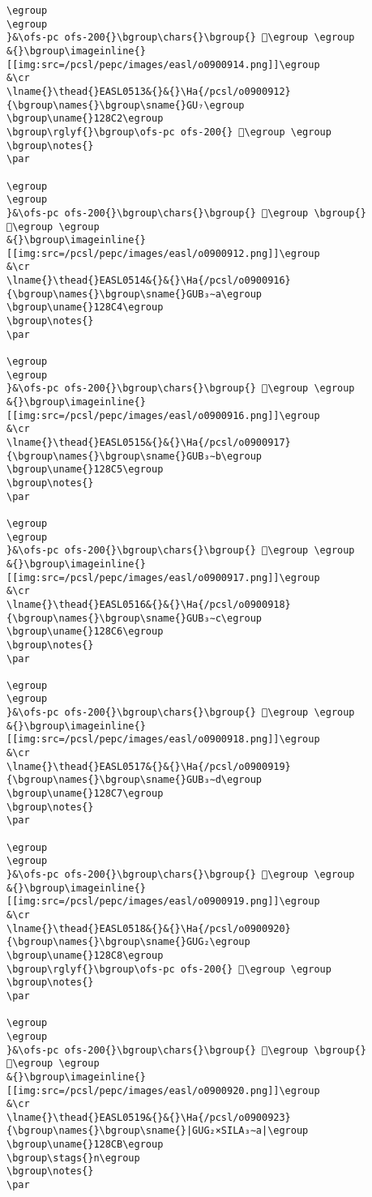 \begin{verbatim}
\egroup
\egroup
}&\ofs-pc ofs-200{}\bgroup\chars{}\bgroup{} 𒣀\egroup \egroup
&{}\bgroup\imageinline{}[[img:src=/pcsl/pepc/images/easl/o0900914.png]]\egroup
&\cr
\lname{}\thead{}EASL0513&{}&{}\Ha{/pcsl/o0900912}{\bgroup\names{}\bgroup\sname{}GU₇\egroup
\bgroup\uname{}128C2\egroup
\bgroup\rglyf{}\bgroup\ofs-pc ofs-200{} 𒣂\egroup \egroup
\bgroup\notes{}
\par 

\egroup
\egroup
}&\ofs-pc ofs-200{}\bgroup\chars{}\bgroup{} 𒣂\egroup \bgroup{} 𒣃\egroup \egroup
&{}\bgroup\imageinline{}[[img:src=/pcsl/pepc/images/easl/o0900912.png]]\egroup
&\cr
\lname{}\thead{}EASL0514&{}&{}\Ha{/pcsl/o0900916}{\bgroup\names{}\bgroup\sname{}GUB₃∼a\egroup
\bgroup\uname{}128C4\egroup
\bgroup\notes{}
\par 

\egroup
\egroup
}&\ofs-pc ofs-200{}\bgroup\chars{}\bgroup{} 𒣄\egroup \egroup
&{}\bgroup\imageinline{}[[img:src=/pcsl/pepc/images/easl/o0900916.png]]\egroup
&\cr
\lname{}\thead{}EASL0515&{}&{}\Ha{/pcsl/o0900917}{\bgroup\names{}\bgroup\sname{}GUB₃∼b\egroup
\bgroup\uname{}128C5\egroup
\bgroup\notes{}
\par 

\egroup
\egroup
}&\ofs-pc ofs-200{}\bgroup\chars{}\bgroup{} 𒣅\egroup \egroup
&{}\bgroup\imageinline{}[[img:src=/pcsl/pepc/images/easl/o0900917.png]]\egroup
&\cr
\lname{}\thead{}EASL0516&{}&{}\Ha{/pcsl/o0900918}{\bgroup\names{}\bgroup\sname{}GUB₃∼c\egroup
\bgroup\uname{}128C6\egroup
\bgroup\notes{}
\par 

\egroup
\egroup
}&\ofs-pc ofs-200{}\bgroup\chars{}\bgroup{} 𒣆\egroup \egroup
&{}\bgroup\imageinline{}[[img:src=/pcsl/pepc/images/easl/o0900918.png]]\egroup
&\cr
\lname{}\thead{}EASL0517&{}&{}\Ha{/pcsl/o0900919}{\bgroup\names{}\bgroup\sname{}GUB₃∼d\egroup
\bgroup\uname{}128C7\egroup
\bgroup\notes{}
\par 

\egroup
\egroup
}&\ofs-pc ofs-200{}\bgroup\chars{}\bgroup{} 𒣇\egroup \egroup
&{}\bgroup\imageinline{}[[img:src=/pcsl/pepc/images/easl/o0900919.png]]\egroup
&\cr
\lname{}\thead{}EASL0518&{}&{}\Ha{/pcsl/o0900920}{\bgroup\names{}\bgroup\sname{}GUG₂\egroup
\bgroup\uname{}128C8\egroup
\bgroup\rglyf{}\bgroup\ofs-pc ofs-200{} 𒣈\egroup \egroup
\bgroup\notes{}
\par 

\egroup
\egroup
}&\ofs-pc ofs-200{}\bgroup\chars{}\bgroup{} 𒣊\egroup \bgroup{} 𒣈\egroup \egroup
&{}\bgroup\imageinline{}[[img:src=/pcsl/pepc/images/easl/o0900920.png]]\egroup
&\cr
\lname{}\thead{}EASL0519&{}&{}\Ha{/pcsl/o0900923}{\bgroup\names{}\bgroup\sname{}|GUG₂×SILA₃∼a|\egroup
\bgroup\uname{}128CB\egroup
\bgroup\stags{}n\egroup
\bgroup\notes{}
\par 


\end{verbatim}
